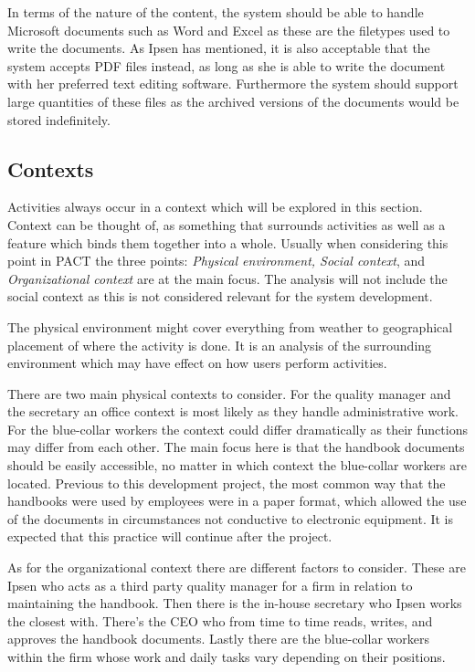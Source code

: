 In terms of the nature of the content, the system should be able to handle Microsoft documents such as Word and Excel as these are the filetypes used to write the documents.
As Ipsen has mentioned, it is also acceptable that the system accepts PDF files instead, as long as she is able to write the document with her preferred text editing software.
Furthermore the system should support large quantities of these files as the archived versions of the documents would be stored indefinitely.

\subsection{Contexts}
Activities always occur in a context which will be explored in this section.
Context can be thought of, as something that surrounds activities as well as a feature which binds them together into a whole.
Usually when considering this point in PACT the three points: \textit{Physical environment, Social context}, and \textit{Organizational context} are at the main focus.
The analysis will not include the social context as this is not considered relevant for the system development.

The physical environment might cover everything from weather to geographical placement of where the activity is done.
It is an analysis of the surrounding environment which may have effect on how users perform activities.

There are two main physical contexts to consider.
For the quality manager and the secretary an office context is most likely as they handle administrative work.
For the blue-collar workers the context could differ dramatically as their functions may differ from each other.
The main focus here is that the handbook documents should be easily accessible, no matter in which context the blue-collar workers are located.
Previous to this development project, the most common way that the handbooks were used by employees were in a paper format, which allowed the use of the documents in circumstances not conductive to electronic equipment.
It is expected that this practice will continue after the project.

As for the organizational context there are different factors to consider.
These are Ipsen who acts as a third party quality manager for a firm in relation to maintaining the handbook.
Then there is the in-house secretary who Ipsen works the closest with.
There's the CEO who from time to time reads, writes, and approves the handbook documents.
Lastly there are the blue-collar workers within the firm whose work and daily tasks vary depending on their positions.

